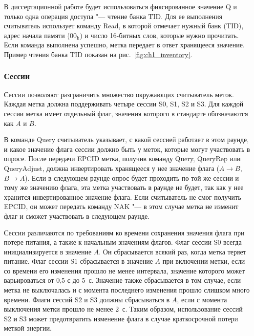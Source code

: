 В диссертационной работе будет использоваться фиксированное значение Q и только одна операция доступа "--- чтение банка TID. Для ее выполнения считыватель использует команду Read, в которой отмечает нужный банк (TID), адрес начала памяти ($\text{00}_\text{h}$) и число 16-битных слов, которые нужно прочитать. Если команда выполнена успешно, метка передает в ответ хранящееся значение. Пример чтения банка TID показан на рис.~\ref{fig:ch1_inventory}.



\subsubsection{Сессии}\label{sec:ch1_rfid_std_sessions}

Сессии позволяют разграничить множество окружающих считыватель меток. Каждая метка должна поддерживать четыре сессии S0, S1, S2 и S3. Для каждой сессии метка имеет отдельный флаг, значения которого в стандарте обозначаются как $A$ и $B$.

В команде Query считыватель указывает, с какой сессией работает в этом раунде, и какое значение флага сессии должно быть у меток, которые могут участвовать в опросе. После передачи EPCID метка, получив команду Query, QueryRep или QueryAdjust, должна инвертировать хранящееся у нее значение флага ($A \rightarrow B$, $B \rightarrow A$). Если в следующем раунде опрос будет проходить по той же сессии и тому же значению флага, эта метка участвовать в раунде не будет, так как у нее хранится инвертированное значение флага. Если считыватель не смог получить EPCID, он может передать команду NAK "--- в этом случае метка не изменит флаг и сможет участвовать в следующем раунде.

Сессии различаются по требованиям ко времени сохранения значения флага при потере питания, а также к начальным значениям флагов. Флаг сессии S0 всегда инициализируется в значение $A$. Он сбрасывается всякий раз, когда метка теряет питание. Флаг сессии S1 сбрасывается в значение $A$ при включении метки, если со времени его изменения прошло не менее интервала, значение которого может варьироваться от 0,5 с до 5~с. Значение также сбрасывается в том случае, если метка не выключалась и с момента последнего изменения прошло слишком много времени. Флаги сессий S2 и S3 должны сбрасываться в $A$, если с момента выключения метки прошло не менее 2~с. Таким образом, использование сессий S2 и S3 может предотвратить изменение флага в случае краткосрочной потери меткой энергии.

